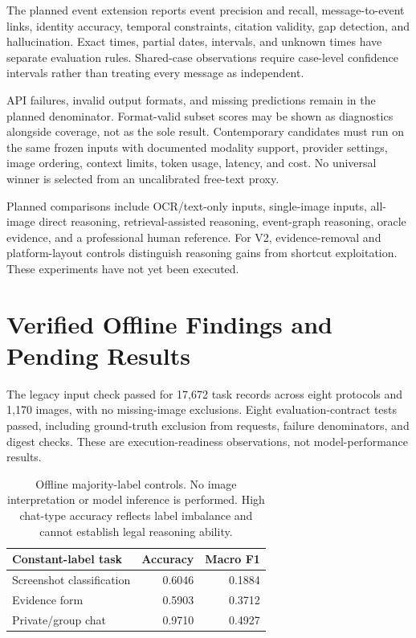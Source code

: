 \documentclass[11pt]{article}
\begin{document}
The planned event extension reports event precision and recall, message-to-event links, identity accuracy, temporal constraints, citation validity, gap detection, and hallucination. Exact times, partial dates, intervals, and unknown times have separate evaluation rules. Shared-case observations require case-level confidence intervals rather than treating every message as independent.

API failures, invalid output formats, and missing predictions remain in the planned denominator. Format-valid subset scores may be shown as diagnostics alongside coverage, not as the sole result. Contemporary candidates must run on the same frozen inputs with documented modality support, provider settings, image ordering, context limits, token usage, latency, and cost. No universal winner is selected from an uncalibrated free-text proxy.

Planned comparisons include OCR/text-only inputs, single-image inputs, all-image direct reasoning, retrieval-assisted reasoning, event-graph reasoning, oracle evidence, and a professional human reference. For V2, evidence-removal and platform-layout controls distinguish reasoning gains from shortcut exploitation. These experiments have not yet been executed.

\section{Verified Offline Findings and Pending Results}
The legacy input check passed for 17,672 task records across eight protocols and 1,170 images, with no missing-image exclusions. Eight evaluation-contract tests passed, including ground-truth exclusion from requests, failure denominators, and digest checks. These are execution-readiness observations, not model-performance results.

\begin{table}[t]
\centering\small
\begin{tabular}{lrr}
\toprule
Constant-label task & Accuracy & Macro F1 \\
\midrule
Screenshot classification & 0.6046 & 0.1884 \\
Evidence form & 0.5903 & 0.3712 \\
Private/group chat & 0.9710 & 0.4927 \\
\bottomrule
\end{tabular}
\caption{Offline majority-label controls. No image interpretation or model inference is performed. High chat-type accuracy reflects label imbalance and cannot establish legal reasoning ability.}
\label{tab:controls}
\end{table}
\end{document}
